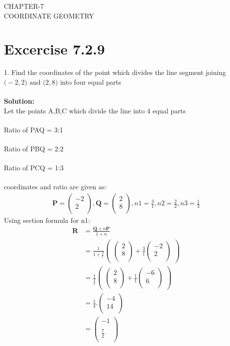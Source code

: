 \documentclass[12pt]{article}
\newcommand{\solution}{\noindent \textbf{Solution: }}
\newcommand{\myvec}[1]{\ensuremath{\begin{pmatrix}#1\end{pmatrix}}}
\let\vec\mathbf
\begin{document}
\begin{center}
\textbf\large{CHAPTER-7 \\ COORDINATE GEOMETRY}
\end{center}
\section*{Excercise 7.2.9}

1. Find the coordinates of the point which divides the line segment joining $\vec(-2,2) \text{ and } \vec(2,8)$ into four equal parts
\\
\\
\solution\\		
Let the points A,B,C which divide the line into 4 equal parts\\
\\
Ratio of PAQ = 3:1\\
\\
Ratio of PBQ = 2:2\\
\\
Ratio of PCQ = 1:3\\
\\
coordinates and ratio are given as:
\begin{align}
\vec{P}=\myvec{-2\\2\\},
\vec{Q}=\myvec{2\\8\\},
n1=\frac{3}{1},
n2=\frac{2}{2},
n3=\frac{1}{3}
\end{align}
Using section formula for n1:
\begin{align}
\vec{R}&=\frac{\vec{Q}+n\vec{P}}{1+n}\\
&=\frac{1}{1+\frac{3}{1}}  \myvec{\myvec{
2\\
8\\
}
  +
   \frac{3}{1}\myvec{
-2\\
2\\
}}\\
&= \frac{1}{\frac{4}{1}} \myvec{\myvec{
2\\
8\\
}
  +
\frac{1}{1}\myvec{
-6\\
6\\
}} \\
&=\frac{1}{4}.
\myvec{
-4\\
14\\
}\\
&=\myvec{
-1\\
\\
\frac{7}{2}\\
}
\end{align}
\end{document}
